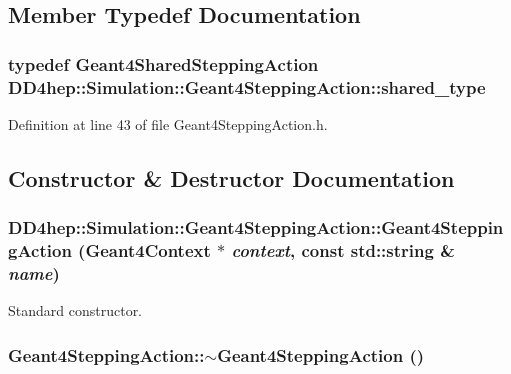 \subsection{Member Typedef Documentation}
\hypertarget{class_d_d4hep_1_1_simulation_1_1_geant4_stepping_action_aa247da84b511779fc413ecb3fbe57125}{
\subsubsection[{shared\_\-type}]{\setlength{\rightskip}{0pt plus 5cm}typedef {\bf Geant4SharedSteppingAction} {\bf DD4hep::Simulation::Geant4SteppingAction::shared\_\-type}}}
\label{class_d_d4hep_1_1_simulation_1_1_geant4_stepping_action_aa247da84b511779fc413ecb3fbe57125}


Definition at line 43 of file Geant4SteppingAction.h.

\subsection{Constructor \& Destructor Documentation}
\hypertarget{class_d_d4hep_1_1_simulation_1_1_geant4_stepping_action_a90a69104683bd6828b42e5d9915ef3a1}{
\subsubsection[{Geant4SteppingAction}]{\setlength{\rightskip}{0pt plus 5cm}DD4hep::Simulation::Geant4SteppingAction::Geant4SteppingAction ({\bf Geant4Context} $\ast$ {\em context}, \/  const std::string \& {\em name})}}
\label{class_d_d4hep_1_1_simulation_1_1_geant4_stepping_action_a90a69104683bd6828b42e5d9915ef3a1}


Standard constructor. \hypertarget{class_d_d4hep_1_1_simulation_1_1_geant4_stepping_action_a906c5651b3a3f39a44b4a3b5ab236375}{
\subsubsection[{$\sim$Geant4SteppingAction}]{\setlength{\rightskip}{0pt plus 5cm}Geant4SteppingAction::$\sim$Geant4SteppingAction ()}}
\label{class_d_d4hep_1_1_simulation_1_1_geant4_stepping_action_a906c5651b3a3f39a44b4a3b5ab236375}


